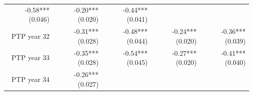 \documentclass[]{article}
\begin{document}
\begin{longtable}[c]{@{}rrrrr@{}}
\begin{minipage}[t]{0.16\columnwidth}
-0.58*** (0.046)
\strut\end{minipage} &
\begin{minipage}[t]{0.18\columnwidth}\raggedleft\strut
-0.20*** (0.020)
\strut\end{minipage} &
\begin{minipage}[t]{0.15\columnwidth}\raggedleft\strut
-0.44*** (0.041)
\strut\end{minipage}\tabularnewline
\begin{minipage}[t]{0.17\columnwidth}\raggedleft\strut
PTP year 32
\strut\end{minipage} &
\begin{minipage}[t]{0.20\columnwidth}\raggedleft\strut
-0.31*** (0.028)
\strut\end{minipage} &
\begin{minipage}[t]{0.16\columnwidth}\raggedleft\strut
-0.48*** (0.044)
\strut\end{minipage} &
\begin{minipage}[t]{0.18\columnwidth}\raggedleft\strut
-0.24*** (0.020)
\strut\end{minipage} &
\begin{minipage}[t]{0.15\columnwidth}\raggedleft\strut
-0.36*** (0.039)
\strut\end{minipage}\tabularnewline
\begin{minipage}[t]{0.17\columnwidth}\raggedleft\strut
PTP year 33
\strut\end{minipage} &
\begin{minipage}[t]{0.20\columnwidth}\raggedleft\strut
-0.35*** (0.028)
\strut\end{minipage} &
\begin{minipage}[t]{0.16\columnwidth}\raggedleft\strut
-0.54*** (0.045)
\strut\end{minipage} &
\begin{minipage}[t]{0.18\columnwidth}\raggedleft\strut
-0.27*** (0.020)
\strut\end{minipage} &
\begin{minipage}[t]{0.15\columnwidth}\raggedleft\strut
-0.41*** (0.040)
\strut\end{minipage}\tabularnewline
\begin{minipage}[t]{0.17\columnwidth}\raggedleft\strut
PTP year 34
\strut\end{minipage} &
\begin{minipage}[t]{0.20\columnwidth}\raggedleft\strut
-0.26*** (0.027)
\strut\end{minipage} &
\begin{minipage}[t]{0.16\columnwidth}\raggedleft\strut

\end{minipage}
\end{longtable}
\end{document}
